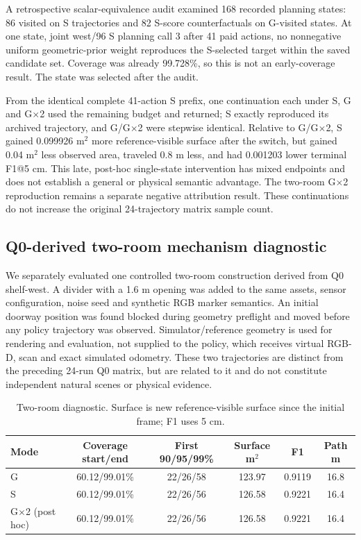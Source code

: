 \documentclass[11pt,a4paper]{article}
\begin{document}
A retrospective scalar-equivalence audit examined 168 recorded planning states: 86 visited on S trajectories and 82 S-score counterfactuals on G-visited states. At one state, joint west/96 S planning call 3 after 41 paid actions, no nonnegative uniform geometric-prior weight reproduces the S-selected target within the saved candidate set. Coverage was already 99.728\%, so this is not an early-coverage result. The state was selected after the audit.

From the identical complete 41-action S prefix, one continuation each under S, G and G$\times$2 used the remaining budget and returned; S exactly reproduced its archived trajectory, and G/G$\times$2 were stepwise identical. Relative to G/G$\times$2, S gained 0.099926 m$^2$ more reference-visible surface after the switch, but gained 0.04 m$^2$ less observed area, traveled 0.8 m less, and had 0.001203 lower terminal F1@5 cm. This late, post-hoc single-state intervention has mixed endpoints and does not establish a general or physical semantic advantage. The two-room G$\times$2 reproduction remains a separate negative attribution result. These continuations do not increase the original 24-trajectory matrix sample count.

\subsection{Q0-derived two-room mechanism diagnostic}\label{two-room-diagnostic}

We separately evaluated one controlled two-room construction derived from Q0 shelf-west. A divider with a 1.6 m opening was added to the same assets, sensor configuration, noise seed and synthetic RGB marker semantics. An initial doorway position was found blocked during geometry preflight and moved before any policy trajectory was observed. Simulator/reference geometry is used for rendering and evaluation, not supplied to the policy, which receives virtual RGB-D, scan and exact simulated odometry. These two trajectories are distinct from the preceding 24-run Q0 matrix, but are related to it and do not constitute independent natural scenes or physical evidence.

\begin{table}[!htbp]
\centering
\caption{Two-room diagnostic. Surface is new reference-visible surface since the initial frame; F1 uses 5 cm.}
\label{tab:two-room}
\small
\begin{tabular}{lccccc}
\toprule
Mode & Coverage start/end & First 90/95/99\% & Surface m$^2$ & F1 & Path m \\
\midrule
G & 60.12/99.01\% & 22/26/58 & 123.97 & 0.9119 & 16.8 \\
S & 60.12/99.01\% & 22/26/56 & 126.58 & 0.9221 & 16.4 \\
G$\times$2 (post hoc) & 60.12/99.01\% & 22/26/56 & 126.58 & 0.9221 & 16.4 \\
\bottomrule
\end{tabular}
\end{table}
\end{document}
